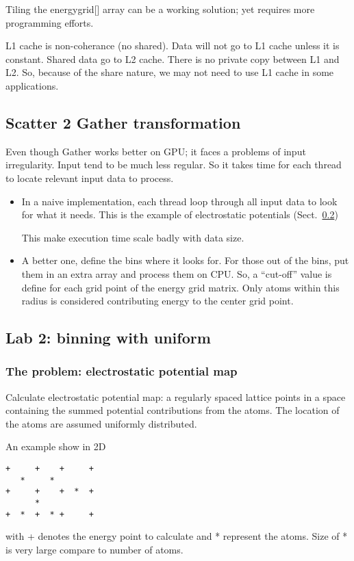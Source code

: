Tiling the energygrid[] array can be a working solution; yet requires
more programming efforts. 


L1 cache is non-coherance (no shared). Data will not go to L1 cache
unless it is constant. Shared data go to L2 cache. There is no private
copy between L1 and L2. So, because of the share nature, we may not
need to use L1 cache in some applications. 

\subsection{Scatter 2 Gather transformation}
\label{sec:scatter-2-gather}

Even though Gather works better on GPU; it faces a problems of input
irregularity.  Input tend to be much less regular. So it takes time
for each thread to locate relevant input data to process.
\begin{itemize}
\item In a naive implementation, each thread loop through all input
  data to look for what it needs. This is the example of electrostatic
  potentials (Sect.~\ref{sec:lab-2:-binning})
  
  This make execution time scale badly with data size.

\item A better one, define the bins where it looks for. For those out
  of the bins, put them in an extra array and process them on CPU. So,
  a ``cut-off'' value is define for each grid point of the energy grid
  matrix. Only atoms within this radius is considered contributing
  energy to the center grid point. 
\end{itemize}


\subsection{Lab 2: binning with uniform}
\label{sec:lab-2:-binning}


\subsubsection{The problem: electrostatic potential map}
\label{sec:probl-electr-potent}

Calculate electrostatic potential map: a regularly spaced lattice
points in a space containing  the summed potential contributions from
the atoms. The location of the atoms are assumed uniformly
distributed. 

An example show in 2D
\begin{verbatim}
+     +    +     +
   *     * 
+     +    +  *  +
      *  
+  *  +  * +     +
\end{verbatim}
with + denotes the energy point to calculate and * represent the
atoms. Size of * is very large compare to number of atoms. 


